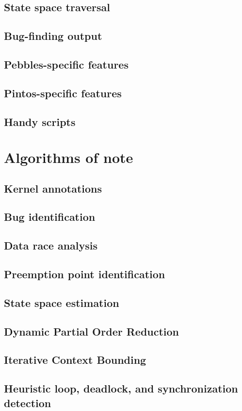 \subsection{State space traversal}
\subsection{Bug-finding output}
\subsection{Pebbles-specific features}
\subsection{Pintos-specific features}
\subsection{Handy scripts}
\label{sec:landslide-glue}

\section{Algorithms of note}

\subsection{Kernel annotations}
\subsection{Bug identification}
\subsection{Data race analysis}
\subsection{Preemption point identification}
\label{sec:landslide-pps}
\subsection{State space estimation}
\subsection{Dynamic Partial Order Reduction}
\label{sec:landslide-dpor}
\subsection{Iterative Context Bounding}
\label{sec:landslide-icb}
\subsection{Heuristic loop, deadlock, and synchronization detection}
